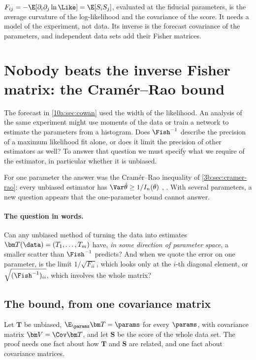 \begin{keyidea}
$F_{ij}=-\E[\partial_i\partial_j\ln\Like]=\E[S_iS_j]$, evaluated at the fiducial parameters, is the average
curvature of the log-likelihood and the covariance of the score. It needs a model of the experiment, not
data. Its inverse is the forecast covariance of the parameters, and independent data sets add their Fisher
matrices.
\end{keyidea}
\section{Nobody beats the inverse Fisher matrix: the Cram\'er--Rao bound}
\label{10a:sec:cr}

The forecast in \cref{10a:sec:cowan} used the width of the likelihood.
An analysis of the same experiment might use moments of the data or train a
network to estimate the parameters from a histogram. Does $\Fish^{-1}$
describe the precision of a maximum likelihood fit alone, or does it limit
the precision of other estimators as well? To answer that question we must
specify what we require of the estimator, in particular whether it is
unbiased.

For one parameter the answer was the Cram\'er--Rao inequality of \cref{3b:sec:cramer-rao}: every unbiased
estimator has $\Var\hat\theta\ge1/I_n(\theta)$ , . With
several parameters, a new question appears that the one-parameter bound cannot answer.

\paragraph{The question in words.} Can any unbiased method of turning the data into estimates
$\bm T(\data)=(T_1,\dots,T_m)$ have, \emph{in some direction of parameter space}, a smaller scatter than
$\Fish^{-1}$ predicts? And when we quote the error on one parameter, is the limit $1/\sqrt{F_{ii}}$, which
looks only at the $i$-th diagonal element, or $\sqrt{(\Fish^{-1})_{ii}}$, which involves the whole matrix?

\subsection{The bound, from one covariance matrix}
\label{10a:sec:cr-derive}

Let $\bm T$ be unbiased, $\E_{\params}\bm T=\params$ for every $\params$, with covariance matrix
$\bm V=\Cov\bm T$, and let $\bm S$ be the score of the whole data set. The proof needs one fact about how
$\bm T$ and $\bm S$ are related, and one fact about covariance matrices.

